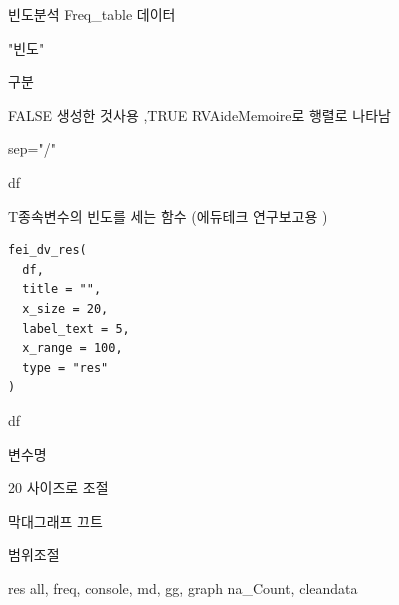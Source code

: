 \documentclass[a4paper]{book}
\begin{document}
%
\begin{Arguments}
\begin{ldescription}
\item[\code{tabledf}] 빈도분석 Freq\_table 데이터

\item[\code{col}] "빈도"

\item[\code{name}] 구분

\item[\code{ns}] FALSE 생성한 것사용 ,TRUE RVAideMemoire로 행렬로 나타남

\item[\code{sep}] sep="/"
\end{ldescription}
\end{Arguments}
%
\begin{Value}
df
\end{Value}
%
\begin{Examples}
\end{Examples}
%
\begin{Description}
T종속변수의 빈도를 세는 함수 (에듀테크 연구보고용 )
\end{Description}
%
\begin{Usage}
\begin{verbatim}
fei_dv_res(
  df,
  title = "",
  x_size = 20,
  label_text = 5,
  x_range = 100,
  type = "res"
)
\end{verbatim}
\end{Usage}
%
\begin{Arguments}
\begin{ldescription}
\item[\code{df}] df

\item[\code{title}] 변수명

\item[\code{x\_size}] 20 사이즈로 조절

\item[\code{label\_text}] 막대그래프 끄트

\item[\code{x\_range}] 범위조절

\item[\code{type}] res all, freq, console, md, gg, graph na\_Count, cleandata
\end{ldescription}
\end{Arguments}
\end{document}
